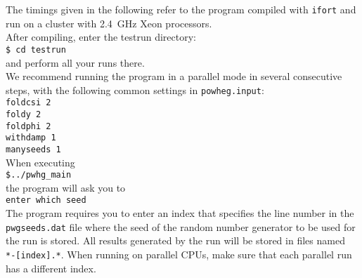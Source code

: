 \documentclass[a4paper,11pt]{article}
\begin{document}
%
%
The timings given in the following refer to the program compiled with
{\tt ifort} and run on a cluster with 2.4~GHz Xeon processors.
\\[2ex]
After compiling, enter the testrun directory:
\\[2ex]
{\tt \$ cd testrun}
\\[2ex]
and perform all your runs there. 
\\[2ex]
We recommend running the program in a parallel mode in several consecutive steps, with the following common settings in {\tt powheg.input}:
\\[2ex]
{\tt foldcsi   2}
\\
{\tt foldy     2}
\\
{\tt foldphi   2}
\\
{\tt withdamp   1}
\\
{\tt manyseeds   1}
\\[2ex]
When executing
\\[2ex]
{\tt \$../pwhg\_main}
\\[2ex]
the program will ask you to
\\[2ex]
{\tt enter which seed}
\\[2ex]
The program requires you to enter an index that specifies the line
number in the {\tt pwgseeds.dat} file where the seed of the random
number generator to be used for the run is stored. All results
generated by the run will be stored in files named {\tt
  *-[index].*}. When running on parallel CPUs, make sure that each
parallel run has a different index.
% 
\end{document}
